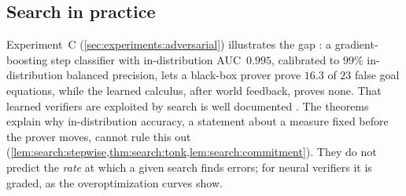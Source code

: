 \subsection{Search in practice}\label{sec:search:practice}

Experiment~C (\cref{sec:experiments:adversarial}) illustrates the gap : a gradient-boosting step classifier with in-distribution AUC~$0.995$, calibrated to $99\%$ in-distribution balanced precision, lets a black-box prover prove $16.3$ of $23$ false goal equations, while the learned calculus, after world feedback, proves none. That learned verifiers are exploited by search is well documented \citep{gao2023scaling,cobbe2021training}. The theorems explain why in-distribution accuracy, a statement about a measure fixed before the prover moves, cannot rule this out (\cref{lem:search:stepwise,thm:search:tonk,lem:search:commitment}). They do not predict the \emph{rate} at which a given search finds errors; for neural verifiers it is graded, as the overoptimization curves show.

